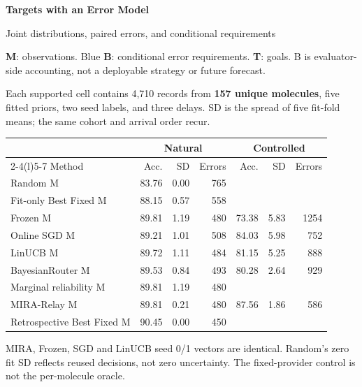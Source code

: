 \documentclass[10pt,letterpaper]{article}
\newcommand{\NA}{\textemdash}
\newcommand{\note}[1]{{\fontsize{8.5}{10.5}\selectfont #1\par}}
\newcommand{\sect}[1]{\vspace{5pt}{\large\bfseries #1}\par\vspace{2pt}}
\newenvironment{clean}{\begin{center}\fontsize{9.5}{11.5}\selectfont\setlength{\tabcolsep}{6pt}\renewcommand{\arraystretch}{1.06}}{\end{center}}
\begin{document}
{\LARGE\bfseries Targets with an Error Model}\par
{\large Joint distributions, paired errors, and conditional requirements}\par
\textbf{M}: observations. Blue \textbf{B}: conditional error requirements. \textbf{T}: goals.
B is evaluator-side accounting, not a deployable strategy or future forecast.

\sect{E1 / body Table 3: measured comparison and spread}
Each supported cell contains 4,710 records from \textbf{157 unique molecules}, five fitted priors,
two seed labels, and three delays. SD is the spread of five fit-fold means; the same cohort and arrival order recur.
\par\noindent\begin{minipage}{\linewidth}\end{minipage}\par
\begin{clean}\begin{tabular}{@{}lrrrrrr@{}}
\toprule
& \multicolumn{3}{c}{Natural} & \multicolumn{3}{c}{Controlled} \\ \cmidrule(lr){2-4}\cmidrule(l){5-7} Method & Acc. & SD & Errors & Acc. & SD & Errors \\
\midrule
Random M & 83.76 & 0.00 & 765 & \NA & \NA & \NA \\
Fit-only Best Fixed M & 88.15 & 0.57 & 558 & \NA & \NA & \NA \\
Frozen M & 89.81 & 1.19 & 480 & 73.38 & 5.83 & 1254 \\
Online SGD M & 89.21 & 1.01 & 508 & 84.03 & 5.98 & 752 \\
LinUCB M & 89.72 & 1.11 & 484 & 81.15 & 5.25 & 888 \\
BayesianRouter M & 89.53 & 0.84 & 493 & 80.28 & 2.64 & 929 \\
Marginal reliability M & 89.81 & 1.19 & 480 & \NA & \NA & \NA \\
MIRA-Relay M & 89.81 & 0.21 & 480 & 87.56 & 1.86 & 586 \\
Retrospective Best Fixed M & 90.45 & 0.00 & 450 & \NA & \NA & \NA \\
\bottomrule\end{tabular}\end{clean}
\note{MIRA, Frozen, SGD and LinUCB seed 0/1 vectors are identical. Random's zero fit SD reflects reused decisions, not zero uncertainty. The fixed-provider control is not the per-molecule oracle.}
\end{document}
